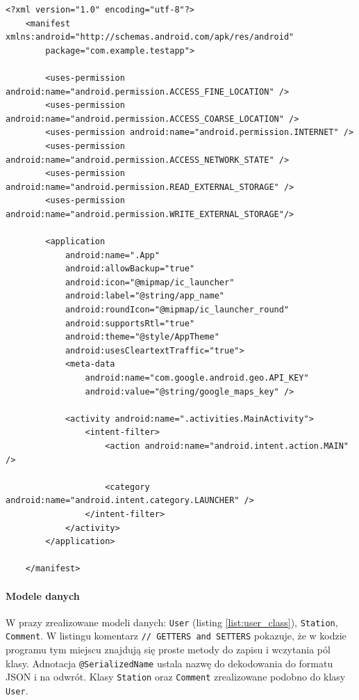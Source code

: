 \begin{lstlisting}[label=list:androidManifest,caption=androidManifest.xml,basicstyle=\tiny\ttfamily]
    <?xml version="1.0" encoding="utf-8"?>
    <manifest xmlns:android="http://schemas.android.com/apk/res/android"
        package="com.example.testapp">
    
        <uses-permission android:name="android.permission.ACCESS_FINE_LOCATION" />
        <uses-permission android:name="android.permission.ACCESS_COARSE_LOCATION" />
        <uses-permission android:name="android.permission.INTERNET" />
        <uses-permission android:name="android.permission.ACCESS_NETWORK_STATE" />
        <uses-permission android:name="android.permission.READ_EXTERNAL_STORAGE" />
        <uses-permission android:name="android.permission.WRITE_EXTERNAL_STORAGE"/>
    
        <application
            android:name=".App"
            android:allowBackup="true"
            android:icon="@mipmap/ic_launcher"
            android:label="@string/app_name"
            android:roundIcon="@mipmap/ic_launcher_round"
            android:supportsRtl="true"
            android:theme="@style/AppTheme"
            android:usesCleartextTraffic="true">
            <meta-data
                android:name="com.google.android.geo.API_KEY"
                android:value="@string/google_maps_key" />
    
            <activity android:name=".activities.MainActivity">
                <intent-filter>
                    <action android:name="android.intent.action.MAIN" />
    
                    <category android:name="android.intent.category.LAUNCHER" />
                </intent-filter>
            </activity>
        </application>
    
    </manifest>
\end{lstlisting}

 
\paragraph{Modele danych\newline}
W prazy zrealizowane modeli danych: \texttt{User} (listing \ref{list:user_class}), \texttt{Station}, \texttt{Comment}. W listingu komentarz \texttt{// GETTERS and SETTERS} pokazuje, że w kodzie programu tym miejscu znajdują się proste metody do zapisu i wczytania pól klasy.
Adnotacja \texttt{@SerializedName} ustala nazwę do dekodowania do formatu JSON i na odwrót. Klasy \texttt{Station} oraz \texttt{Comment} zrealizowane podobno do klasy \texttt{User}.

